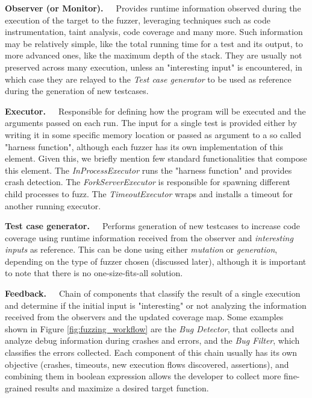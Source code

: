 \textbf{Observer (or Monitor).}\ \ \ Provides runtime information observed during the execution of the target to the fuzzer, leveraging techniques such as code instrumentation, taint analysis, code coverage and many more. Such information may be relatively simple, like the total running time for a test and its output, to more advanced ones, like the maximum depth of the stack. They are usually not preserved across many execution, unless an "interesting input" is encountered, in which case they are relayed to the \textit{Test case generator}  to be used as reference during the generation of new testcases. 

\textbf{Executor.}\ \ \ Responsible for defining how the program will be executed and the arguments passed on each run. The input for a single test is provided either by writing it in some specific memory location or passed as argument to a so called "harness function", although each fuzzer has its own implementation of this element. Given this, we briefly mention few standard functionalities that compose this element. The \textit{InProcessExecutor} runs the "harness function" and provides crash detection. The \textit{ForkServerExecutor} is responsible for spawning different child processes to fuzz. The \textit{TimeoutExecutor} wraps and installs a timeout for another running executor.

\textbf{Test case generator.}\ \ \ Performs generation of new testcases to increase code coverage using runtime information received from the observer and \textit{interesting inputs} as reference. This can be done using either \textit{mutation} or \textit{generation}, depending on the type of fuzzer chosen (discussed later), although it is important to note that there is no one-size-fits-all solution.

\textbf{Feedback.}\ \ \ Chain of components that classify the result of a single execution and determine if the initial input is "interesting" or not analyzing the information received from the observers and the updated coverage map. Some examples shown in Figure \ref{fig:fuzzing_workflow} are the \textit{Bug Detector}, that collects and analyze debug information during crashes and errors, and the \textit{Bug Filter}, which classifies the errors collected.
Each component of this chain usually has its own objective (crashes, timeouts, new execution flows discovered, assertions), and combining them in boolean expression allows the developer to collect more fine-grained results and maximize a desired target function.

